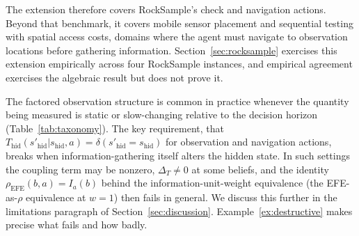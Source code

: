 The extension therefore covers RockSample's check and navigation actions. Beyond that benchmark, it covers mobile sensor placement and sequential testing with spatial access costs, domains where the agent must navigate to observation locations before gathering information. Section~\ref{sec:rocksample} exercises this extension empirically across four RockSample instances, and empirical agreement exercises the algebraic result but does not prove it.

The factored observation structure is common in practice whenever the quantity being measured is static or slow-changing relative to the decision horizon (Table~\ref{tab:taxonomy}). The key requirement, that $T_{\mathrm{hid}}(s'_{\mathrm{hid}} | s_{\mathrm{hid}}, a) = \delta(s'_{\mathrm{hid}} = s_{\mathrm{hid}})$ for observation and navigation actions, breaks when information-gathering itself alters the hidden state. In such settings the coupling term may be nonzero, $\Delta_T \neq 0$ at some beliefs, and the identity $\rho_{\mathrm{EFE}}(b,a) = I_a(b)$ behind the information-unit-weight equivalence (the EFE-as-$\rho$ equivalence at $w{=}1$) then fails in general. We discuss this further in the limitations paragraph of Section~\ref{sec:discussion}. Example~\ref{ex:destructive} makes precise what fails and how badly.

